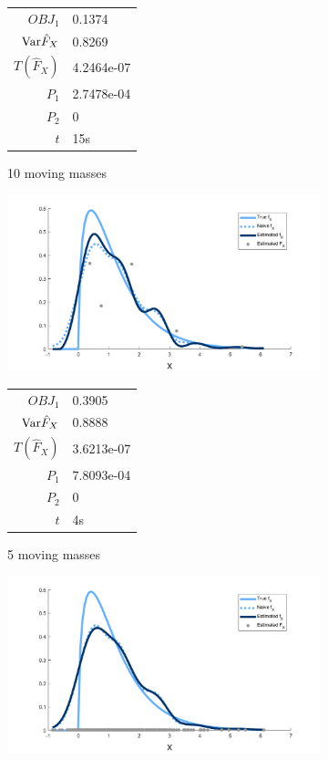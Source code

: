 \begin{figure}
\begin{subfigure}[b]{0.49\textwidth}
		\begin{tabular}{r l}
			$OBJ_1$ & 0.1374\\
			$\mathrm{Var} \hat{F}_X$ & 0.8269\\
			$T(\hat{F}_X)$ & 4.2464e-07\\
			$P_1$ & 2.7478e-04\\
			$P_2$ & 0\\
			$t$ & 15s
		\end{tabular}
		\caption{10 moving masses}
		\label{fig:moving masses m10 example}
	\end{subfigure}
	\begin{subfigure}[b]{0.49\textwidth}
		\centering
		\includegraphics[width = \textwidth]{Figures/Deconvolution/moving_masses_m5_example.png}
		\begin{tabular}{r l}
			$OBJ_1$ & 0.3905\\
			$\mathrm{Var} \hat{F}_X$ & 0.8888\\
			$T(\hat{F}_X)$ & 3.6213e-07\\
			$P_1$ & 7.8093e-04\\
			$P_2$ & 0\\
			$t$ & 4s
		\end{tabular}
		\caption{5 moving masses}
		\label{fig:moving masses m5 example}
	\end{subfigure}
	\hfill
	\begin{subfigure}[b]{0.49\textwidth}
		\centering
		\includegraphics[width = \textwidth]{Figures/Deconvolution/emp_masses_example.png}

\end{subfigure}
\end{figure}
